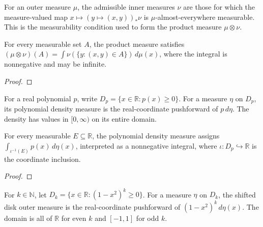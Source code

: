 \begin{supporting}
\begin{definition}
\label{def:product-measure-input}
\leanok
For an outer measure $\mu$, the admissible inner measures $\nu$ are those
for which the measure-valued map $x\mapsto(y\mapsto(x,y))_*\nu$ is
$\mu$-almost-everywhere measurable. This is the measurability condition used
to form the product measure $\mu\otimes\nu$.
\end{definition}
\begin{theorem}
\label{thm:product-measure-input}
\leanok
For every measurable set $A$, the product measure satisfies
$(\mu\otimes\nu)(A)=\int \nu(\{y:(x,y)\in A\})\,d\mu(x)$,
where the integral is nonnegative and may be infinite.
\end{theorem}
\begin{proof}
\leanok
\end{proof}

\begin{definition}
\label{def:polynomial-density-measure}
\leanok
For a real polynomial $p$, write $D_p=\{x\in\mathbb R:p(x)\ge0\}$.
For a measure $\eta$ on $D_p$, its polynomial density measure is the real-coordinate
pushforward of $p\,d\eta$. The density has values in $[0,\infty)$ on its entire domain.
\end{definition}

\begin{theorem}
\label{thm:polynomial-density-measure}
\leanok
For every measurable $E\subseteq\mathbb R$, the polynomial density measure assigns
$\int_{\iota^{-1}(E)}p(x)\,d\eta(x)$, interpreted as a nonnegative integral, where
$\iota:D_p\hookrightarrow\mathbb R$ is the coordinate inclusion.
\end{theorem}
\begin{proof}
\leanok
\end{proof}

\begin{definition}
\label{def:disk-outer-measure}
\leanok
For $k\in\mathbb N$, let $D_k=\{x\in\mathbb R:(1-x^2)^k\ge0\}$.
For a measure $\eta$ on $D_k$, the shifted disk outer measure is the real-coordinate
pushforward of $(1-x^2)^k\,d\eta(x)$. The domain is all of $\mathbb R$ for even
$k$ and $[-1,1]$ for odd $k$.
\end{definition}


\end{supporting}
